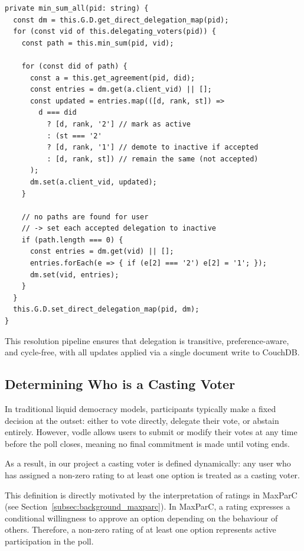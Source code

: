 \begin{verbatim}
private min_sum_all(pid: string) {
  const dm = this.G.D.get_direct_delegation_map(pid);
  for (const vid of this.delegating_voters(pid)) {
    const path = this.min_sum(pid, vid);

    for (const did of path) {
      const a = this.get_agreement(pid, did);
      const entries = dm.get(a.client_vid) || [];
      const updated = entries.map(([d, rank, st]) =>
        d === did
          ? [d, rank, '2'] // mark as active
          : (st === '2'
          ? [d, rank, '1'] // demote to inactive if accepted
          : [d, rank, st]) // remain the same (not accepted)
      );
      dm.set(a.client_vid, updated);
    }

    // no paths are found for user
    // -> set each accepted delegation to inactive
    if (path.length === 0) {
      const entries = dm.get(vid) || [];
      entries.forEach(e => { if (e[2] === '2') e[2] = '1'; });
      dm.set(vid, entries);
    }
  }
  this.G.D.set_direct_delegation_map(pid, dm);
}
\end{verbatim}

This resolution pipeline ensures that delegation is transitive, preference-aware, and cycle-free, with all updates applied via a single document write to CouchDB.

\subsection{Determining Who is a Casting Voter}

In traditional liquid democracy models, participants typically make a fixed decision at the outset: either to vote directly, delegate their vote, or abstain entirely. However, vodle allows users to submit or modify their votes at any time before the poll closes, meaning no final commitment is made until voting ends.

As a result, in our project a casting voter is defined dynamically: any user who has assigned a non-zero rating to at least one option is treated as a casting voter.

This definition is directly motivated by the interpretation of ratings in MaxParC (see Section~\ref{subsec:background_maxparc}). In MaxParC, a rating expresses a conditional willingness to approve an option depending on the behaviour of others. Therefore, a non-zero rating of at least one option represents active participation in the poll.


